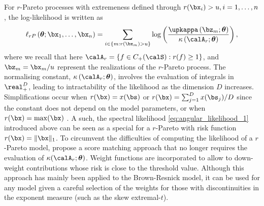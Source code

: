 \documentclass[12pt]{article}
\begin{document}

For $r$-Pareto processes with extremeness defined through $r(\bx_i)>u, i=1, \ldots,n$, the log-likelihood is written as
%
$$
\ell_{rP}\left( \bm \theta; \bx_1, \ldots, \bx_n \right) = \sum_{i \in \left\{ m: r(\bx_m) > u \right\}} \log \left( \frac{\upkappa \left(\bz_m; \bm \theta \right)}{\kappa\left( \calA_r; \bm \theta \right)} \right),
$$
%
where we recall that here $\calA_r = \left\{ f \in C_+(\calS): r(f) \geq 1 \right\}$, and $\bz_{m} = \bx_{m}/u$ represent the realizations of the $r$-Pareto process. The normalising constant, $\kappa\left( \calA_r; \bm \theta \right)$, involves the evaluation of integrals in $\real_+^D$, leading to intractability of the likelihood as the dimension $D$ increases. Simplifications occur when $r(\bx) = x(\bs)$ or $r(\bx) = \sum_{j=1}^D x(\bs_j)/D$ since the constant does not depend on the model parameters, or when $r(\bx) = \max(\bx)$ \citep[see][]{deFondeville.Davison:2018, Dombry.etal:2024}. A such, the spectral likelihood \eqref{eq:angular_likelihood_1} introduced above can be seen as a special for a $r$-Pareto with risk function $r(\bx) = \| \bx \|_1$. 
%
To circumvent the difficulties of computing the likelihood of a $r$-Pareto model, \citet{deFondeville.Davison:2018} propose a score matching approach that no longer requires the evaluation of $\kappa(\calA_r;\bm \theta)$. Weight functions are incorporated to allow to down-weight contributions whose risk is close to the threshold value. Although this approach has mainly been applied to the Brown-Resnick model, it can be used for any model given a careful selection of the weights for those with discontinuities in the exponent measure (such as the skew extremal-$t$).
\end{document}
